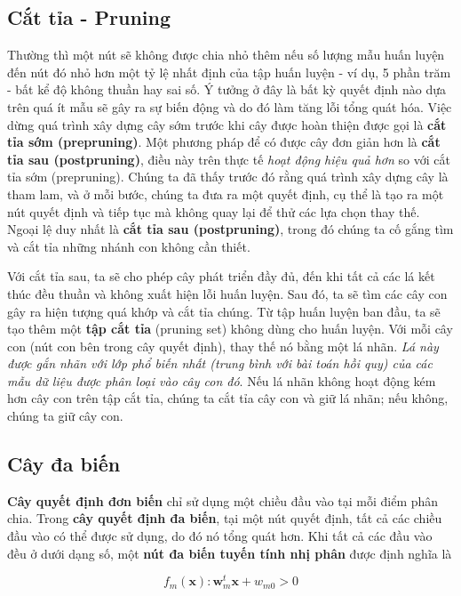 \subsection{Cắt tỉa - Pruning}
Thường thì một nút sẽ không được chia nhỏ thêm nếu số lượng mẫu huấn luyện đến nút đó nhỏ hơn một tỷ lệ nhất định của tập huấn luyện - ví dụ, 5 phần trăm - bất kể độ không thuần hay sai số. Ý tưởng ở đây là bất kỳ quyết định nào dựa trên quá ít mẫu sẽ gây ra sự biến động và do đó làm tăng lỗi tổng quát hóa. Việc dừng quá trình xây dựng cây sớm trước khi cây được hoàn thiện được gọi là \textbf{cắt tỉa sớm (prepruning)}.
Một phương pháp để có được cây đơn giản hơn là \textbf{cắt tỉa sau (postpruning)}, điều này trên thực tế \textit{hoạt động hiệu quả hơn} so với cắt tỉa sớm (prepruning). Chúng ta đã thấy trước đó rằng quá trình xây dựng cây là tham lam, và ở mỗi bước, chúng ta đưa ra một quyết định, cụ thể là tạo ra một nút quyết định và tiếp tục mà không quay lại để thử các lựa chọn thay thế. Ngoại lệ duy nhất là \textbf{cắt tỉa sau (postpruning)}, trong đó chúng ta cố gắng tìm và cắt tỉa những nhánh con không cần thiết.

Với cắt tỉa sau, ta sẽ cho phép cây phát triển đầy đủ, đến khi tất cả các lá kết thúc đều thuần và không xuất hiện lỗi huấn luyện. Sau đó, ta sẽ tìm các cây con gây ra hiện tượng quá khớp và cắt tỉa chúng. Từ tập huấn luyện ban đầu, ta sẽ tạo thêm một \textbf{tập cắt tỉa} (pruning set) không dùng cho huấn luyện. Với mỗi cây con (nút con bên trong cây quyết định), thay thế nó bằng một lá nhãn. \textit{Lá này được gắn nhãn với lớp phổ biến nhất (trung bình với bài toán hồi quy) của các mẫu dữ liệu được phân loại vào cây con đó}. Nếu lá nhãn không hoạt động kém hơn cây con trên tập cắt tỉa, chúng ta cắt tỉa cây con và giữ lá nhãn; nếu không, chúng ta giữ cây con.

\subsection{Cây đa biến}
\textbf{Cây quyết định đơn biến} chỉ sử dụng một chiều đầu vào tại mỗi điểm phân chia. Trong \textbf{cây quyết định đa biến}, tại một nút quyết định, tất cả các chiều đầu vào có thể được sử dụng, do đó nó tổng quát hơn. Khi tất cả các đầu vào đều ở dưới dạng số, một \textbf{nút đa biến tuyến tính nhị phân} được định nghĩa là

\begin{equation} f_m(\mathbf{x}): \mathbf{w}_m^t\mathbf{x} + w_{m0} > 0 \end{equation}

